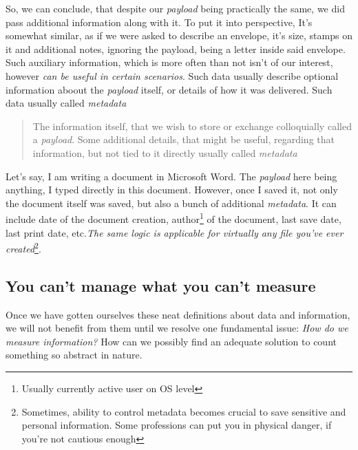 \documentclass{article}
\begin{document}
            So, we can conclude, that despite our \emph{payload} being practically the same, we did pass additional information along with it. To put it into perspective,
            It's somewhat similar, as if we were asked to describe an envelope, it's size, stamps on it and additional notes, ignoring the payload, being a letter inside
            said envelope. Such auxiliary information, which is more often than not isn't of our interest, however \emph{can be useful in certain scenarios}. Such data
            usually describe optional information aboout the \emph{payload} itself, or details of how it was delivered. Such data usually called \emph{metadata}

            \begin{quote}
                The information itself, that we wish to store or exchange colloquially called a \emph{payload}. Some additional details, that might be useful, regarding
                that information, but not tied to it directly usually called \emph{metadata}
            \end{quote}

            Let's say, I am writing a document in Microsoft Word. The \emph{payload} here being anything, I typed directly in this document. However, once I saved it, not
            only the document itself was saved, but also a bunch of additional \emph{metadata}. It can include date of the document creation, 
            author\footnote{Usually currently active user on OS level} of the document, last save date, last print date, etc.\emph{The same logic is applicable for virtually
            any file you've ever created}\footnote{Sometimes, ability to control metadata becomes crucial to save sensitive and personal information. 
            Some professions can put you in physical danger, if you're not cautious enough}.\par

            \newpage
        \subsection{You can't manage what you can't measure}
            Once we have gotten ourselves these neat definitions about data and information, we will not benefit from them until we resolve one fundamental issue:
            \emph{How do we measure information?} How can we possibly find an adequate solution to count something so abstract in nature. \par 
\end{document}

